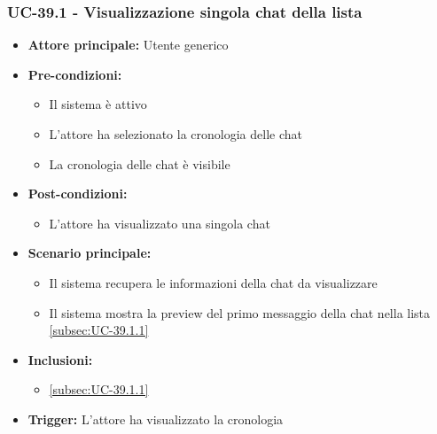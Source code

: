\documentclass[a4paper,12pt]{article}
\begin{document}
\subsubsection{UC-39.1 - Visualizzazione singola chat della lista} \label{subsec:UC-39.1}
\begin{itemize}
    \item \textbf{Attore principale:} Utente generico
    \item \textbf{Pre-condizioni:}
    \begin{itemize}
        \item Il sistema è attivo
        \item L'attore ha selezionato la cronologia delle chat
        \item La cronologia delle chat è visibile
    \end{itemize}
    \item \textbf{Post-condizioni:} 
    \begin{itemize}
        \item L'attore ha visualizzato una singola chat
    \end{itemize}
    \item \textbf{Scenario principale:} 
    \begin{itemize}
        \item Il sistema recupera le informazioni della chat da visualizzare
        \item Il sistema mostra la preview del primo messaggio della chat nella lista \ref{subsec:UC-39.1.1}
    \end{itemize}
    \item \textbf{Inclusioni:}
    \begin{itemize}
        \item \ref{subsec:UC-39.1.1}
    \end{itemize}
    \item \textbf{Trigger:} L'attore ha visualizzato la cronologia
\end{itemize}
\end{document}
